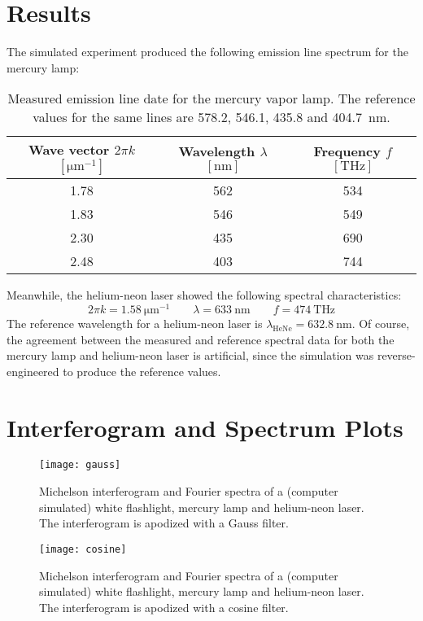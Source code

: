 \documentclass[11pt, a4paper]{article}
\begin{document}
\section{Results}

The simulated experiment produced the following emission line spectrum for the mercury lamp:
\begin{table}[htb!]
\centering
\begin{tabular}{c|c|c}
	Wave vector $ 2\pi k $ $ [\si{\micro \meter^{-1}}] $  & Wavelength $ \lambda $ $ [\si{\nano \meter}] $ & Frequency $ f $ $ [\si{\tera \hertz}] $\\
	\hline
	1.78 & 562 & 534 \\
	1.83 & 546 & 549 \\
	2.30 & 435 & 690 \\
	2.48 & 403 & 744
\end{tabular}
\caption{Measured emission line date for the mercury vapor lamp. The reference values for the same lines are 578.2, 546.1, 435.8 and \SI{404.7}{\nano \meter}. }
\end{table}

Meanwhile, the helium-neon laser showed the following spectral characteristics:
\begin{equation*}
	2\pi k = \SI{1.58}{\micro \meter^{-1}} \qquad \lambda = \SI{633}{\nano \meter} \qquad f = \SI{474}{\tera \hertz}
\end{equation*}
The reference wavelength for a helium-neon laser is $ \lambda_{\text{HeNe}} = \SI{632.8}{\nano \meter} $. Of course, the agreement between the measured and reference spectral data for both the mercury lamp and helium-neon laser is artificial, since the simulation was reverse-engineered to produce the reference values.

\newpage


\section{Interferogram and Spectrum Plots}

\begin{figure}[htb!]
\centering
\texttt{[image: gauss]}
\caption{Michelson interferogram and Fourier spectra of a (computer simulated) white flashlight, mercury lamp and helium-neon laser. The interferogram is apodized with a Gauss filter.}
\end{figure}


\begin{figure}
\centering
\texttt{[image: cosine]}
\caption{Michelson interferogram and Fourier spectra of a (computer simulated) white flashlight, mercury lamp and helium-neon laser. The interferogram is apodized with a cosine filter.}
\end{figure}
\end{document}
